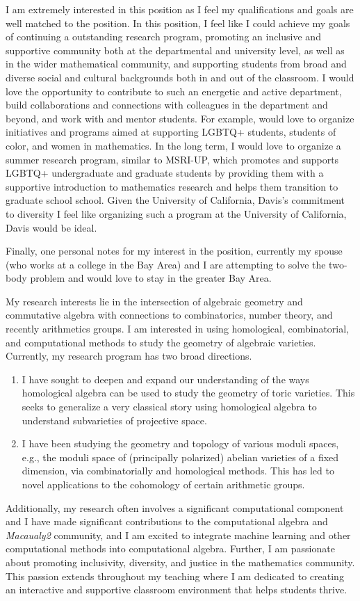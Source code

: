 \documentclass[11pt]{article}
\begin{document}
I am extremely interested in this position as I feel my qualifications and goals are well matched to the position. In this position, I feel like I could achieve my goals of continuing a outstanding research program, promoting an inclusive and supportive community both at the departmental and university level, as well as in the wider mathematical community, and supporting students from broad and diverse social and cultural backgrounds both in and out of the classroom. I would love the opportunity to contribute to such an energetic and active department, build collaborations and connections with colleagues in the department and beyond, and work with and mentor students. For example, would love to organize initiatives and programs aimed at supporting LGBTQ+ students, students of color, and women in mathematics. In the long term, I would love to organize a summer research program, similar to MSRI-UP, which promotes and supports LGBTQ+ undergraduate and graduate students by providing them with a supportive introduction to mathematics research and helps them transition to graduate school school. Given the University of California, Davis's commitment to diversity I feel like organizing such a program at the University of California, Davis would be ideal. 

Finally, one personal notes for my interest in the position, currently my spouse (who works at a college in the Bay Area) and I are attempting to solve the two-body problem and would love to stay in the greater Bay Area. 

My research interests lie in the intersection of algebraic geometry and commutative algebra with connections to combinatorics, number theory, and recently arithmetics groups. I am interested in using homological, combinatorial, and computational methods to study the geometry of algebraic varieties. Currently, my research program has two broad directions.
\begin{enumerate}[leftmargin=*,label=(\roman*)]
\item I have sought to deepen and expand our understanding of the ways homological algebra can be used to study the geometry of toric varieties. This seeks to generalize a very classical story using homological algebra to understand subvarieties of projective space.
\item I have been studying the geometry and topology of various moduli spaces, e.g., the moduli space of (principally polarized) abelian varieties of a fixed dimension, via combinatorially and homological methods. This has led to novel applications to the cohomology of certain arithmetic groups. 
\end{enumerate}
Additionally, my research often involves a significant computational component and I have made significant contributions to the computational algebra and \textit{Macaualy2} community, and I am excited to integrate machine learning and other computational methods into computational algebra. Further, I am passionate about promoting inclusivity, diversity, and justice in the mathematics community. This passion extends throughout my teaching where I am dedicated to creating an interactive and supportive classroom environment that helps students thrive.
\end{document}
